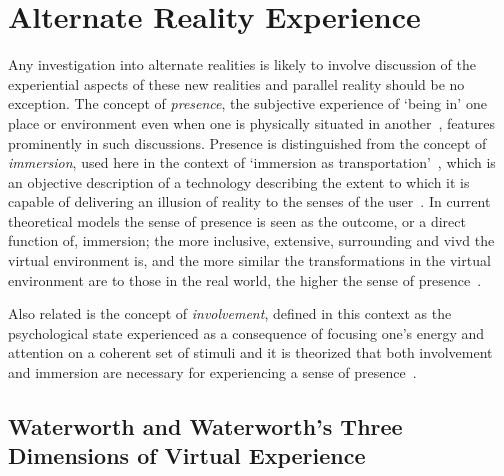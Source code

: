 
\section{Alternate Reality Experience}

\label{lit-review-presencec}
Any investigation into alternate realities is likely to involve discussion of the experiential aspects of these new realities and parallel reality should be no exception. The concept of \textit{presence}, the subjective experience of `being in' one place or environment even when one is physically situated in another~\cite{Witmer1998}, features prominently in such discussions. Presence is distinguished from the concept of \textit{immersion}, used here in the context of `immersion as transportation'~\cite{Calleja2014}, which is an objective description of a technology describing the extent to which it is capable of delivering an illusion of reality to the senses of the user~\cite{Slater1997}. In current theoretical models the sense of presence is seen as the outcome, or a direct function of, immersion; the more inclusive, extensive, surrounding and vivd the virtual environment is, and the more similar the transformations in the virtual environment are to those in the real world, the higher the sense of presence~\cite{Constantin2003}.

Also related is the concept of \textit{involvement}, defined in this context as the psychological state experienced as a consequence of focusing one's energy and attention on a coherent set of stimuli and it is theorized that both involvement and immersion are necessary for experiencing a sense of presence~\cite{Witmer1998}.

\subsection{Waterworth and Waterworth's Three Dimensions of Virtual Experience}
\label{waterworthandwaterworth}
\newcommand{\presencefootnote}{\footnote{\textbf{Presence} in the context of this model is defined as a state of heightened perceptual processing of environmental stimuli (\textit{``a psychological focus on direct perceptual processing''}~\cite{Waterworth2001}) accompanied by lessened conceptual reasoning, covering cases both in which the environmental stimuli originate from the subject's immediate real surroundings (\textit{unmediated presence}) and when the environmental stimuli originate from a remote real environment, virtual environment or mixed reality environment (\textit{mediated presence})~\cite{Mantovani2010}.}}

